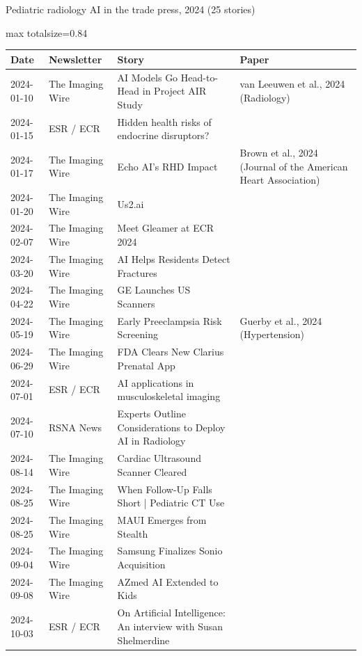 \documentclass[aspectratio=169]{beamer}
\renewcommand{\arraystretch}{1.08}
\begin{document}
\begin{frame}[category=Newsletters]{Pediatric radiology AI in the trade press, 2024 (25 stories)}
\tiny
\begin{adjustbox}{max totalsize={\textwidth}{0.84\textheight}}
\renewcommand{\arraystretch}{1.2}
\begin{tabular}{|l|l|>{\raggedright\arraybackslash}p{}|>{\raggedright\arraybackslash}p{}|}
\hline \textbf{Date} & \textbf{Newsletter} & \textbf{Story} & \textbf{Paper} \\ \hline
2024-01-10 & The Imaging Wire & AI Models Go Head-to-Head in Project AIR Study & van Leeuwen et al., 2024 (Radiology) \\ \hline
2024-01-15 & ESR / ECR & Hidden health risks of endocrine disruptors? &  \\ \hline
2024-01-17 & The Imaging Wire & Echo AI's RHD Impact & Brown et al., 2024 (Journal of the American Heart Association) \\ \hline
2024-01-20 & The Imaging Wire & Us2.ai &  \\ \hline
2024-02-07 & The Imaging Wire & Meet Gleamer at ECR 2024 &  \\ \hline
2024-03-20 & The Imaging Wire & AI Helps Residents Detect Fractures &  \\ \hline
2024-04-22 & The Imaging Wire & GE Launches US Scanners &  \\ \hline
2024-05-19 & The Imaging Wire & Early Preeclampsia Risk Screening & Guerby et al., 2024 (Hypertension) \\ \hline
2024-06-29 & The Imaging Wire & FDA Clears New Clarius Prenatal App &  \\ \hline
2024-07-01 & ESR / ECR & AI applications in musculoskeletal imaging &  \\ \hline
2024-07-10 & RSNA News & Experts Outline Considerations to Deploy AI in Radiology &  \\ \hline
2024-08-14 & The Imaging Wire & Cardiac Ultrasound Scanner Cleared &  \\ \hline
2024-08-25 & The Imaging Wire & When Follow-Up Falls Short | Pediatric CT Use &  \\ \hline
2024-08-25 & The Imaging Wire & MAUI Emerges from Stealth &  \\ \hline
2024-09-04 & The Imaging Wire & Samsung Finalizes Sonio Acquisition &  \\ \hline
2024-09-08 & The Imaging Wire & AZmed AI Extended to Kids &  \\ \hline
2024-10-03 & ESR / ECR & On Artificial Intelligence: An interview with Susan Shelmerdine &  \\ \hline

\end{tabular}
\end{adjustbox}
\end{frame}
\end{document}
